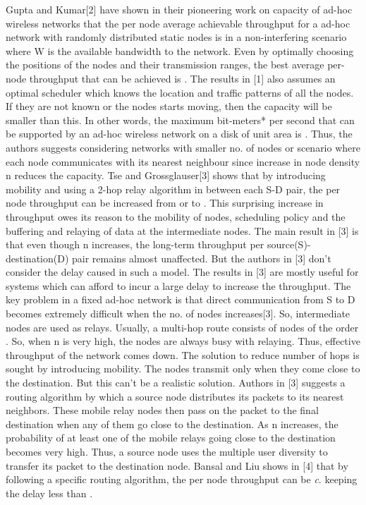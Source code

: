 \documentclass[conference]{IEEEtran}
\begin{document}
Gupta and Kumar[2] have shown in their pioneering work on capacity of ad-hoc wireless networks that the per node average 
achievable throughput for a ad-hoc network with randomly distributed static nodes is  in a non-interfering 
scenario where W is the available bandwidth to the network. Even by optimally choosing the positions of the nodes and
 their transmission ranges, the best average per-node throughput that can be achieved is . The results in [1] also 
assumes an optimal scheduler which knows the location and traffic patterns of all the nodes. If they are not known or 
the nodes starts moving, then the capacity will be smaller than this.  In other words, the maximum bit-meters* per second 
that can be supported by an ad-hoc wireless network on a disk of unit area is . Thus, the authors suggests 
considering networks with smaller no. of nodes or scenario where each node communicates with its nearest neighbour 
since increase in node density n reduces the capacity. Tse and Grossglauser[3] shows that by introducing mobility and 
using a 2-hop relay algorithm in between each S-D pair, the per node throughput can be increased from  or 
 to . This surprising increase in throughput owes its reason to the mobility of nodes, scheduling policy and 
the buffering and relaying of data at the intermediate nodes.  The main result in [3] is that even though n increases, 
the long-term throughput per source(S)-destination(D) pair remains almost unaffected. But the authors in [3] don’t 
consider the delay caused in such a model. The results in [3] are mostly useful for systems which can afford to incur
 a large delay to increase the throughput. The key problem in a fixed ad-hoc network is that direct communication from
 S to D becomes extremely difficult when the no. of nodes increases[3]. So, intermediate nodes are used as relays.
 Usually, a multi-hop route consists of nodes of the order . So, when n is very high, the nodes are always busy with 
relaying. Thus, effective throughput of the network comes down. The solution to reduce number of hops is sought by introducing 
mobility. The nodes transmit only when they come close to the destination. But this can’t be a realistic solution. Authors
 in [3] suggests a routing algorithm by which a source node distributes its packets to its nearest neighbors. These mobile 
relay nodes then pass on the packet to the final destination when any of them go close to the destination. As n increases, 
the probability of at least one of the mobile relays going close to the destination becomes very high. Thus, a source node 
uses the multiple user diversity to transfer its packet to the destination node. Bansal and Liu shows in [4] that by 
following a specific routing algorithm, the per node throughput can be \emph{c}. keeping the delay less than .
\end{document}
